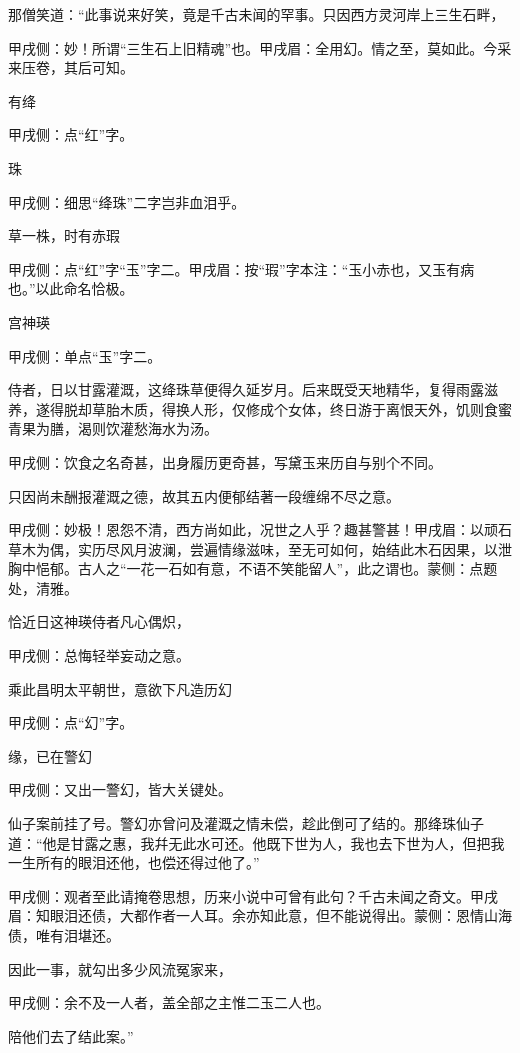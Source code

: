 \begin{parag}
    那僧笑道：“此事说来好笑，竟是千古未闻的罕事。只因西方灵河岸上三生石畔，\begin{note}甲戌侧：妙！所谓“三生石上旧精魂”也。甲戌眉：全用幻。情之至，莫如此。今采来压卷，其后可知。\end{note}有绛\begin{note}甲戌侧：点“红”字。\end{note}珠\begin{note}甲戌侧：细思“绛珠”二字岂非血泪乎。\end{note}草一株，时有赤瑕\begin{note}甲戌侧：点“红”字“玉”字二。甲戌眉：按“瑕”字本注：“玉小赤也，又玉有病也。”以此命名恰极。\end{note}宫神瑛\begin{note}甲戌侧：单点“玉”字二。\end{note}侍者，日以甘露灌溉，这绛珠草便得久延岁月。后来既受天地精华，复得雨露滋养，遂得脱却草胎木质，得换人形，仅修成个女体，终日游于离恨天外，饥则食蜜青果为膳，渴则饮灌愁海水为汤。\begin{note}甲戌侧：饮食之名奇甚，出身履历更奇甚，写黛玉来历自与别个不同。\end{note}只因尚未酬报灌溉之德，故其五内便郁结著一段缠绵不尽之意。\begin{note}甲戌侧：妙极！恩怨不清，西方尚如此，况世之人乎？趣甚警甚！甲戌眉：以顽石草木为偶，实历尽风月波澜，尝遍情缘滋味，至无可如何，始结此木石因果，以泄胸中悒郁。古人之“一花一石如有意，不语不笑能留人”，此之谓也。蒙侧：点题处，清雅。\end{note}恰近日这神瑛侍者凡心偶炽，\begin{note}甲戌侧：总悔轻举妄动之意。\end{note}乘此昌明太平朝世，意欲下凡造历幻\begin{note}甲戌侧：点“幻”字。\end{note}缘，已在警幻\begin{note}甲戌侧：又出一警幻，皆大关键处。\end{note}仙子案前挂了号。警幻亦曾问及灌溉之情未偿，趁此倒可了结的。那绛珠仙子道：“他是甘露之惠，我幷无此水可还。他既下世为人，我也去下世为人，但把我一生所有的眼泪还他，也偿还得过他了。”\begin{note}甲戌侧：观者至此请掩卷思想，历来小说中可曾有此句？千古未闻之奇文。甲戌眉：知眼泪还债，大都作者一人耳。余亦知此意，但不能说得出。蒙侧：恩情山海债，唯有泪堪还。\end{note}因此一事，就勾出多少风流冤家来，\begin{note}甲戌侧：余不及一人者，盖全部之主惟二玉二人也。\end{note}陪他们去了结此案。”
\end{parag}


